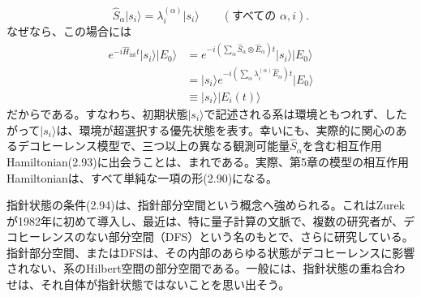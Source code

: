 \hypertarget{srcpage:79}{}\label{srcpage:79}
\begin{equation}\hat S_\alpha\lvert s_i\rangle=\lambda_i^{(\alpha)}\lvert s_i\rangle\qquad(\text{すべての }\alpha,i).\tag{2.94}\end{equation}
なぜなら、この場合には
\begin{equation}\begin{split}e^{-i\hat H_{\mathrm{int}}t}\lvert s_i\rangle\lvert E_0\rangle&=e^{-i(\sum_\alpha\hat S_\alpha\otimes\hat E_\alpha)t}\lvert s_i\rangle\lvert E_0\rangle\\&=\lvert s_i\rangle e^{-i(\sum_\alpha\lambda_i^{(\alpha)}\hat E_\alpha)t}\lvert E_0\rangle\\&\equiv\lvert s_i\rangle\lvert E_i(t)\rangle\end{split}\tag{2.95}\end{equation}
だからである。すなわち、初期状態$\lvert s_i\rangle$で記述される系は環境ともつれず、したがって$\lvert s_i\rangle$は、環境が超選択する優先状態を表す。幸いにも、実際的に関心のあるデコヒーレンス模型で、三つ以上の異なる観測可能量$\hat S_\alpha$を含む相互作用Hamiltonian(2.93)に出会うことは、まれである。実際、第5章の模型の相互作用Hamiltonianは、すべて単純な一項の形(2.90)になる。

指針状態の条件(2.94)は、指針部分空間という概念へ強められる。これはZurekが1982年に初めて導入し\cite{ref009}、最近は、特に量子計算の文脈で、複数の研究者が、デコヒーレンスのない部分空間（DFS）という名のもとで、さらに研究している\cite{ref089,ref090,ref091,ref092,ref093,ref094,ref095,ref096,ref097,ref098}。指針部分空間、またはDFSは、その内部のあらゆる状態がデコヒーレンスに影響されない、系のHilbert空間の部分空間である。一般には、指針状態の重ね合わせは、それ自体が指針状態ではないことを思い出そう。

